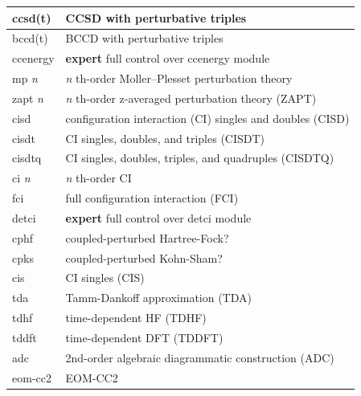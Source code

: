 \documentclass[letterpaper,10pt,english]{sphinxmanual}
\begin{document}
\begin{fulllineitems}
\begin{longtable}{|l|l|}
ccsd(t)
 & 
CCSD with perturbative triples
\\\hline

bccd(t)
 & 
BCCD with perturbative triples
\\\hline

ccenergy
 & 
\textbf{expert} full control over ccenergy module
\\\hline

mp \emph{n}
 & 
\emph{n} th-order Moller--Plesset perturbation theory
\\\hline

zapt \emph{n}
 & 
\emph{n} th-order z-averaged perturbation theory (ZAPT)
\\\hline

cisd
 & 
configuration interaction (CI) singles and doubles (CISD)
\\\hline

cisdt
 & 
CI singles, doubles, and triples (CISDT)
\\\hline

cisdtq
 & 
CI singles, doubles, triples, and quadruples (CISDTQ)
\\\hline

ci \emph{n}
 & 
\emph{n} th-order CI
\\\hline

fci
 & 
full configuration interaction (FCI)
\\\hline

detci
 & 
\textbf{expert} full control over detci module
\\\hline

cphf
 & 
coupled-perturbed Hartree-Fock?
\\\hline

cpks
 & 
coupled-perturbed Kohn-Sham?
\\\hline

cis
 & 
CI singles (CIS)
\\\hline

tda
 & 
Tamm-Dankoff approximation (TDA)
\\\hline

tdhf
 & 
time-dependent HF (TDHF)
\\\hline

tddft
 & 
time-dependent DFT (TDDFT)
\\\hline

adc
 & 
2nd-order algebraic diagrammatic construction (ADC)
\\\hline

eom-cc2
 & 
EOM-CC2
\\\hline


\end{longtable}
\end{fulllineitems}
\end{document}
